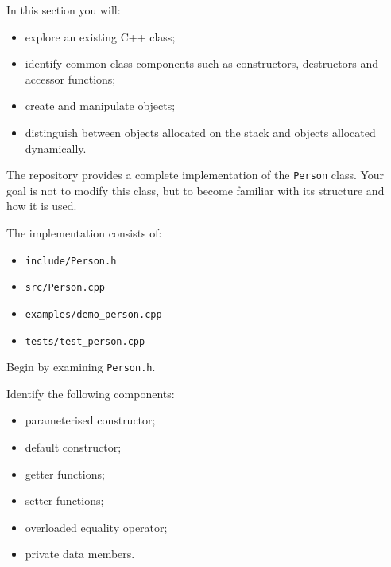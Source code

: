 \documentclass{csc2059practical}
\begin{document}
\begin{learningoutcomes}
    In this section you will:
\begin{itemize}
    
    \item explore an existing C++ class;
    
    \item identify common class components such as constructors,
    destructors and accessor functions;
    
    \item create and manipulate objects;
    
    \item distinguish between objects allocated on the stack and objects
    allocated dynamically.
\end{itemize}


\end{learningoutcomes}

The repository provides a complete implementation of the
\texttt{Person} class. Your goal is not to modify this class, but to
become familiar with its structure and how it is used.

The implementation consists of:

\begin{itemize}

\item \texttt{include/Person.h}

\item \texttt{src/Person.cpp}

\item \texttt{examples/demo\_person.cpp}

\item \texttt{tests/test\_person.cpp}

\end{itemize}

Begin by examining \texttt{Person.h}.

Identify the following components:

\begin{itemize}

\item parameterised constructor;

\item default constructor;

\item getter functions;

\item setter functions;

\item overloaded equality operator;

\item private data members.

\end{itemize}
\end{document}
